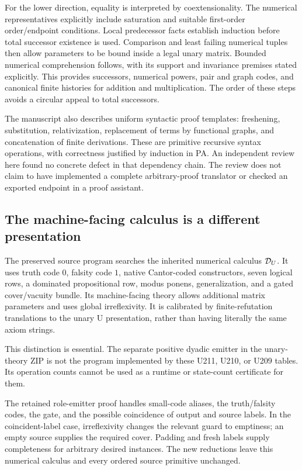 For the lower direction, equality is interpreted by coextensionality.
The numerical representatives explicitly include saturation and suitable
first-order order/endpoint conditions. Local predecessor facts establish
induction before total successor existence is used. Comparison and least
failing numerical tuples then allow parameters to be bound inside a legal
unary matrix. Bounded numerical comprehension follows, with its support and
invariance premises stated explicitly. This provides successors, numerical
powers, pair and graph codes, and canonical finite histories for addition and
multiplication. The order of these steps avoids a circular appeal to total
successors.

The manuscript also describes uniform syntactic proof templates: freshening,
substitution, relativization, replacement of terms by functional graphs, and
concatenation of finite derivations. These are primitive recursive syntax
operations, with correctness justified by induction in PA. An independent
review here found no concrete defect in that dependency chain. The review
does not claim to have implemented a complete arbitrary-proof translator or
checked an exported endpoint in a proof assistant.

\subsection{The machine-facing calculus is a different presentation}
The preserved source program searches the inherited numerical calculus
\(\mathcal D_U\). It uses truth code \(0\), falsity code \(1\), native Cantor-coded
constructors, seven logical rows, a dominated propositional row, modus ponens,
generalization, and a gated cover/vacuity bundle.
Its machine-facing theory allows additional matrix parameters and uses global
irreflexivity. It is calibrated by finite-refutation translations to the
unary U presentation, rather than having literally the same axiom strings.

This distinction is essential. The separate positive dyadic emitter in the
unary-theory ZIP is not the program implemented by these U211, U210, or U209
tables. Its operation counts cannot be used as a runtime or state-count
certificate for them.

The retained role-emitter proof handles small-code aliases, the truth/falsity
codes, the gate, and the possible coincidence of output and source labels.
In the coincident-label case, irreflexivity changes the relevant guard to
emptiness; an empty source supplies the required cover. Padding and fresh
labels supply completeness for arbitrary desired instances.
The new reductions leave this numerical calculus and every ordered source
primitive unchanged.

